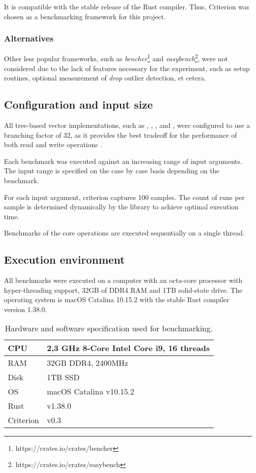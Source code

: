 It is compatible with the stable release of the Rust compiler. Thus, Criterion was chosen as a benchmarking framework for this project. 

\subsubsection*{Alternatives}
Other less popular frameworks, such as \emph{bencher}\footnote{https://crates.io/crates/bencher} and \emph{easybench}\footnote{https://crates.io/crates/easybench}, were not considered due to the lack of features necessary for the experiment, such as setup routines, optional measurement of \emph{drop} outlier detection, et cetera. 

\subsection{Configuration and input size}
All tree-based vector implementations, such as \rbvec{}, \rrbvec{}, \pvec{}, and \imrsvec{}, were configured to use a branching factor of 32, as it provides the best tradeoff for the performance of both read and write operations \cite{efficient-immutable-vectors}. 

Each benchmark was executed against an increasing range of input arguments. The input range is specified on the case by case basis depending on the benchmark. 

For each input argument, criterion captures 100 samples. The count of runs per sample is determined dynamically by the library to achieve optimal execution time. 

Benchmarks of the core operations are executed sequentially on a single thread. 

\subsection{Execution environment}
All benchmarks were executed on a computer with an octa-core processor with hyper-threading support, 32GB of DDR4 RAM and 1TB solid-state drive. The operating system is macOS Catalina 10.15.2 with the stable Rust compiler version 1.38.0.

\begin{table}[!htbp]
    \centering

    \begin{tabular} { |l| p{10cm} | }        
        \hline CPU & 2,3 GHz 8-Core Intel Core i9, 16 threads \\ \hline
        RAM & 32GB DDR4, 2400MHz \\ \hline
        Disk & 1TB SSD \\ \hline
        OS & macOS Catalina v10.15.2 \\ \hline     
        Rust & v1.38.0   \\ \hline
        Criterion & v0.3   \\ \hline
    \end{tabular}
    
    \label{tab:exec-environment}
    \caption{Hardware and software specification used for benchmarking.}
\end{table}

